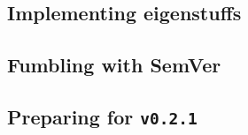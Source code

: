\documentclass[../main.tex]{subfiles}
\begin{document}
\newpage

\subsection{Implementing eigenstuffs\label{development:implementing-eigenstuffs}}


\newpage

\subsection{Fumbling with SemVer\label{development:fumbling-with-semver}}


\newpage

\subsection{Preparing for \texttt{v0.2.1}\label{development:preparing-for-v0.2.1}}

\end{document}
